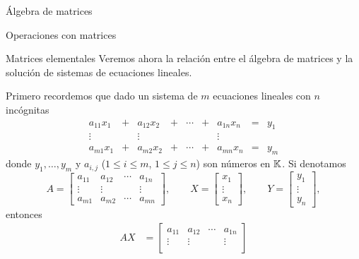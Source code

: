 \begin{chapter}{\'Algebra de matrices}
\begin{section}{Operaciones con matrices}
\begin{enumex}
        \end{enumex}
            
        \end{section}
        
        \begin{section}{Matrices elementales}\label{seccion-matrices-elementales}
            Veremos ahora la relación entre el álgebra de matrices y la solución de sistemas de ecuaciones lineales. 
            
            Primero recordemos que dado un sistema de $m$  ecuaciones lineales con $n$ incógnitas
            \begin{equation}\label{sist-eq-gen-3}
            \begin{matrix} 
            a_{11}x_1& + &a_{12}x_2& + &\cdots& + &a_{1n}x_n &= &y_1\\
            \vdots&  &\vdots& &&  &\vdots \\
            a_{m1}x_1& + &a_{m2}x_2& + &\cdots& + &a_{mn}x_n &=&y_m
            \end{matrix}
            \end{equation}
            donde $y_1, \ldots,y_m$ y $a_{i,j}$ ($1 \le i \le m$, $1 \le j \le n$) son números en $\mathbb K$. Si denotamos
            \begin{equation*}
            A = \begin{bmatrix}
            a_{11}& a_{12}& \cdots &a_{1n} \\
            \vdots&\vdots  &  &\vdots \\
            a_{m1} &a_{m2}&\cdots &a_{mn}\end{bmatrix},\qquad
            X = \begin{bmatrix}
            x_1 \\ \vdots \\ x_n 
            \end{bmatrix},
            \qquad 
            Y = \begin{bmatrix}
            y_1 \\ \vdots \\ y_n
            \end{bmatrix},
            \end{equation*}
            entonces 
            \begin{align*}
            AX &= \begin{bmatrix}
            a_{11}& a_{12}& \cdots &a_{1n} \\
            \vdots&\vdots  &  &\vdots \\

\end{bmatrix}
\end{align*}
\end{section}
\end{chapter}
